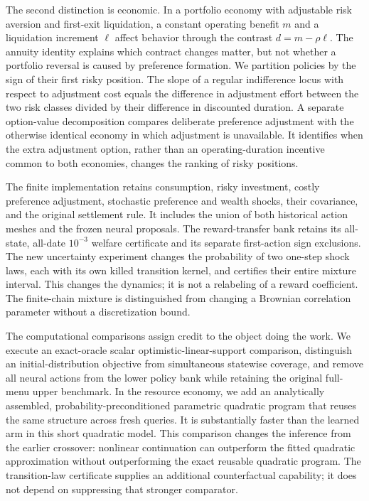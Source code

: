 The second distinction is economic. In a portfolio economy with adjustable risk aversion and first-exit liquidation, a constant operating benefit $m$ and a liquidation increment $\ell$ affect behavior through the contrast $d=m-\rho\ell$. The annuity identity explains which contract changes matter, but not whether a portfolio reversal is caused by preference formation. We partition policies by the sign of their first risky position. The slope of a regular indifference locus with respect to adjustment cost equals the difference in adjustment effort between the two risk classes divided by their difference in discounted duration. A separate option-value decomposition compares deliberate preference adjustment with the otherwise identical economy in which adjustment is unavailable. It identifies when the extra adjustment option, rather than an operating-duration incentive common to both economies, changes the ranking of risky positions.

The finite implementation retains consumption, risky investment, costly preference adjustment, stochastic preference and wealth shocks, their covariance, and the original settlement rule. It includes the union of both historical action meshes and the frozen neural proposals. The reward-transfer bank retains its all-state, all-date $10^{-3}$ welfare certificate and its separate first-action sign exclusions. The new uncertainty experiment changes the probability of two one-step shock laws, each with its own killed transition kernel, and certifies their entire mixture interval. This changes the dynamics; it is not a relabeling of a reward coefficient. The finite-chain mixture is distinguished from changing a Brownian correlation parameter without a discretization bound.

The computational comparisons assign credit to the object doing the work. We execute an exact-oracle scalar optimistic-linear-support comparison, distinguish an initial-distribution objective from simultaneous statewise coverage, and remove all neural actions from the lower policy bank while retaining the original full-menu upper benchmark. In the resource economy, we add an analytically assembled, probability-preconditioned parametric quadratic program that reuses the same structure across fresh queries. It is substantially faster than the learned arm in this short quadratic model. This comparison changes the inference from the earlier crossover: nonlinear continuation can outperform the fitted quadratic approximation without outperforming the exact reusable quadratic program. The transition-law certificate supplies an additional counterfactual capability; it does not depend on suppressing that stronger comparator.

